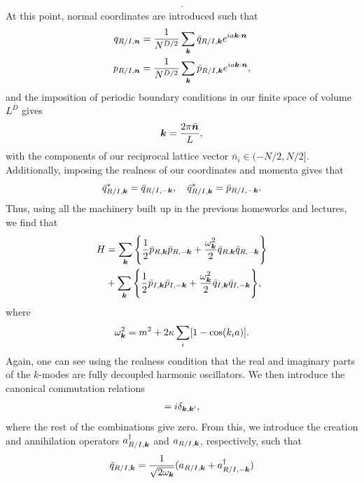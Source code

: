 {\begin{align}
.\end{align}
At this point, normal coordinates are introduced such that
\begin{align}
    q_{R/I,\vb*{n}} &= \frac{1}{N^{D/2}} \sum_{\vb*{k}} \bar{q}_{R/I,\vb*{k}} e^{i a \vb*{k} \cdot \vb*{n}} \\
    p_{R/I,\vb*{n}} &= \frac{1}{N^{D/2}} \sum_{\vb*{k}} \bar{p}_{R/I,\vb*{k}} e^{i a \vb*{k} \cdot \vb*{n}}
,\end{align}
and the imposition of periodic boundary conditions in our finite space of volume $L^{D}$ gives
\begin{align}
    \vb*{k} = \frac{2 \pi \bar{\vb*{n}}}{L}
,\end{align}
with the components of our reciprocal lattice vector $\bar{n}_{i} \in (-N/2,N/2]$.
Additionally, imposing the realness of our coordinates and momenta gives that
\begin{align}
    \bar{q}_{R/I,\vb*{k}}^{*} = \bar{q}_{R/I,-\vb*{k}}, \quad \bar{q}_{R/I,\vb*{k}}^{*} = \bar{p}_{R/I,-\vb*{k}}
.\end{align}
Thus, using all the machinery built up in the previous homeworks and lectures, we find that
\begin{align}
    H &= \sum_{\vb*{k}} \Bigg\{ \frac{1}{2} \bar{p}_{R,\vb*{k}} \bar{p}_{R,-\vb*{k}} + \frac{\omega_{\vb*{k}}^2}{2} \bar{q}_{R,\vb*{k}} \bar{q}_{R,-\vb*{k}} \Bigg\} \nonumber \\
    &+ \sum_{\vb*{k}} \Bigg\{ \frac{1}{2} \bar{p}_{I,\vb*{k}} \bar{p}_{I,-\vb*{k}} + \frac{\omega_{\vb*{k}}^2}{2} \bar{q}_{I,\vb*{k}} \bar{q}_{I,-\vb*{k}} \Bigg\}
,\end{align}
where
\begin{align}
    \omega_{\vb*{k}}^2 = m^2 + 2 \kappa \sum_{i} [ 1 - \cos(k_{i} a) ]
.\end{align}
Again, one can see using the realness condition that the real and imaginary parts of the $k$-modes are fully decoupled harmonic oscillators.
We then introduce the canonical commutation relations
\begin{align}
    [\bar{q}_{R/I,\vb*{k}},\bar{p}_{R/I,-\vb*{k}'}] = i \delta_{\vb*{k},\vb*{k}'}
,\end{align}
where the rest of the combinations give zero.
From this, we introduce the creation and annihilation operators $a_{R/I,\vb*{k}}^{\dagger}$ and $a_{R/I,\vb*{k}}$, respectively, such that
\begin{align}
    \bar{q}_{R/I,\vb*{k}} = \frac{1}{\sqrt{2 \omega_{\vb*{k}}}} ( a_{R/I,\vb*{k}} + a_{R/I,-\vb*{k}}^{\dagger} ) \\

\end{align}}
